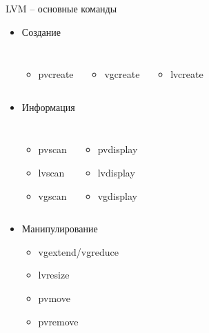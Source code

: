 \documentclass[ignorenonframetext, professionalfonts, hyperref={pdftex, unicode}]{beamer}
\begin{document}
\begin{frame}{LVM -- основные команды}
  \begin{itemize}
    \item Создание
      \begin{columns}
        \begin{itemize}
          \item pvcreate
        \end{itemize}
        \begin{itemize}
          \item vgcreate
        \end{itemize}
        \begin{itemize}
          \item lvcreate
        \end{itemize}
      \end{columns}
     \item Информация
       \begin{columns}
         \begin{itemize}
           \item pvscan
           \item lvscan
           \item vgscan
         \end{itemize}
         \begin{itemize}
           \item pvdisplay
           \item lvdisplay
           \item vgdisplay
         \end{itemize}
       \end{columns}
      \item Манипулирование
        \begin{itemize}
          \item vgextend/vgreduce
          \item lvresize
          \item pvmove
          \item pvremove
         \end{itemize}
     \end{itemize}
    
\end{frame}
\end{document}
